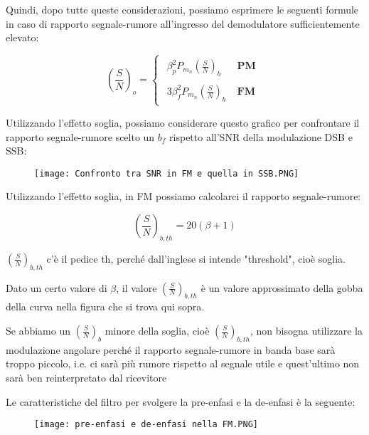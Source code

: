 Quindi, dopo tutte queste considerazioni, possiamo esprimere le seguenti formule in caso di rapporto segnale-rumore all'ingresso del demodulatore sufficientemente elevato: 

{
    \Large 
    \begin{equation}
        \left( \frac{S}{N} \right)_{o}
        = 
        \begin{cases}
        \begin{array}{ll}
            \beta_p ^{2} P_{m_n} \left( \frac{S}{N} \right)_{b} & \textbf{ PM} 
            \\
            \\
            3 \beta_f ^{2} P_{m_n} \left( \frac{S}{N} \right)_{b} & \textbf{ FM}
        \end{array} 
        \end{cases}
    \end{equation}
}

\newpage 

Utilizzando l'effetto soglia, possiamo considerare questo grafico per confrontare il rapporto segnale-rumore 
scelto un $b_f$ rispetto all'SNR della modulazione DSB e SSB:

\begin{figure}[h]
    \centering
    \texttt{[image: Confronto tra SNR in FM e quella in SSB.PNG]}
\end{figure}

Utilizzando l'effetto soglia, in FM possiamo calcolarci il rapporto segnale-rumore: 

{
    \Large 
    \begin{equation}
        \left( \frac{S}{N}\right)_{b, th} = 20 (\beta + 1)
    \end{equation}
}

\begin{tcolorbox}
$\left( \frac{S}{N}\right)_{b, th}$ c'è il pedice th, perché dall'inglese si intende "threshold", cioè soglia. \newline 

Dato un certo valore di $\beta$, 
il valore $\left( \frac{S}{N}\right)_{b, th}$ è un valore approssimato della gobba della curva nella figura che si trova qui sopra. \newline 

Se abbiamo un $\left( \frac{S}{N}\right)_{b}$ minore della soglia, cioè $\left( \frac{S}{N}\right)_{b, th}$, non bisogna utilizzare la modulazione angolare 
perché il rapporto segnale-rumore in banda base sarà troppo piccolo, i.e. ci sarà più rumore rispetto al segnale utile e quest'ultimo non sarà ben reinterpretato dal ricevitore 
\end{tcolorbox}

Le caratteristiche del filtro per svolgere la pre-enfasi e la de-enfasi è la seguente: 

\begin{figure}[h]
    \centering
    \texttt{[image: pre-enfasi e de-enfasi nella FM.PNG]}
\end{figure}

\newpage 
